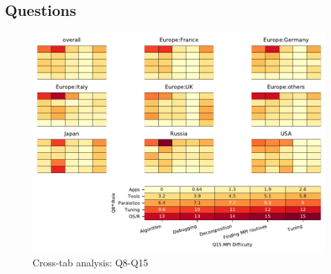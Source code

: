 
\subsection{Questions}


\begin{figure}
\begin{center}
\includegraphics[width=12cm]{../pdfs/Q8-Q15.pdf}
\caption{Cross-tab analysis: Q8-Q15}
\label{fig:Q8-Q15}
\end{center}
\end{figure}
